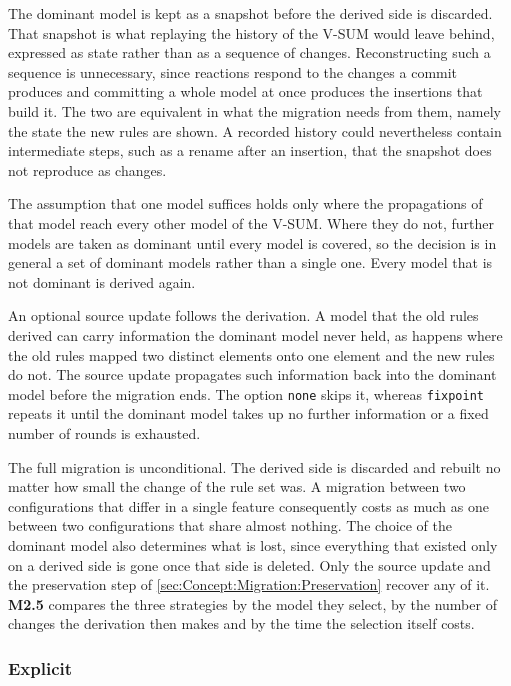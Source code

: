 The dominant model is kept as a snapshot before the derived side is discarded.
That snapshot is what replaying the history of the V-SUM would leave behind, expressed as state rather than as a sequence of changes.
Reconstructing such a sequence is unnecessary, since reactions respond to the changes a commit produces and committing a whole model at once produces the insertions that build it.
The two are equivalent in what the migration needs from them, namely the state the new rules are shown.
A recorded history could nevertheless contain intermediate steps, such as a rename after an insertion, that the snapshot does not reproduce as changes.

The assumption that one model suffices holds only where the propagations of that model reach every other model of the V-SUM.
Where they do not, further models are taken as dominant until every model is covered, so the decision is in general a set of dominant models rather than a single one.
Every model that is not dominant is derived again.

An optional source update follows the derivation.
A model that the old rules derived can carry information the dominant model never held, as happens where the old rules mapped two distinct elements onto one element and the new rules do not.
The source update propagates such information back into the dominant model before the migration ends.
The option \texttt{none} skips it, whereas \texttt{fixpoint} repeats it until the dominant model takes up no further information or a fixed number of rounds is exhausted.

The full migration is unconditional.
The derived side is discarded and rebuilt no matter how small the change of the rule set was.
A migration between two configurations that differ in a single feature consequently costs as much as one between two configurations that share almost nothing.
The choice of the dominant model also determines what is lost, since everything that existed only on a derived side is gone once that side is deleted.
Only the source update and the preservation step of \autoref{sec:Concept:Migration:Preservation} recover any of it.
\textbf{M2.5} compares the three strategies by the model they select, by the number of changes the derivation then makes and by the time the selection itself costs.

\subsubsection{Explicit}
\label{sec:Concept:Migration:FullMigration:Explicit}

